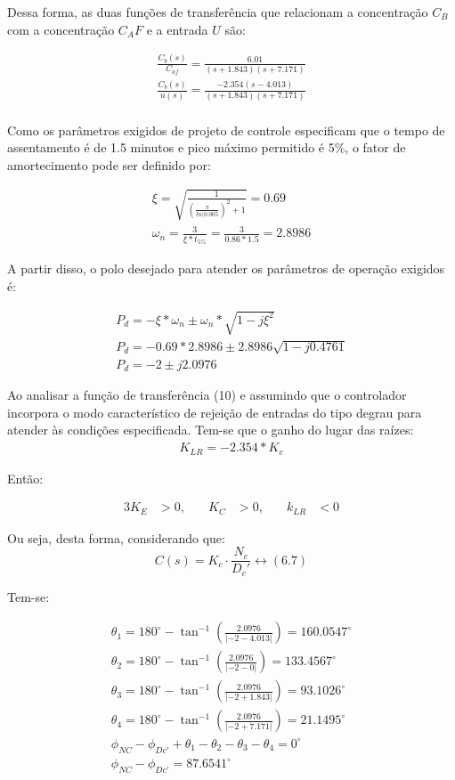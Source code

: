 \documentclass[a4paper,12pt]{article}
\begin{document}
Dessa forma, as duas funções de transferência que relacionam a concentração \(C_B\) com a concentração \(C_AF\) e a entrada \(U\) são:

\begin{align}
\frac{ C_b(s)}{C_{af}} = \frac{6.01}{(s + 1.843)(s + 7.171)}\\
\frac{ C_b(s)}{u(s)} = \frac{-2.354(s-4.013)}{(s + 1.843)(s + 7.171)}
\\
\end{align}


Como os parâmetros exigidos de projeto de controle especificam que o tempo de assentamento é de 1.5 minutos e pico máximo permitido é 5\%, o fator de amortecimento pode ser definido por:

\begin{align}
\xi = \sqrt{\frac{1}{(\frac{\pi}{ln(0.005})^2+1}} = 0.69\\
\omega_n = \frac{3}{\xi*t_{5\%}} = \frac{3}{0.86*1.5} = 2.8986
\end{align}

A partir disso, o polo desejado  para atender os parâmetros de operação exigidos é: 

\begin{align}
P_d = - \xi*\omega_n \pm \omega_n*\sqrt{1-j\xi^2}\\
P_d = - 0.69*2.8986 \pm 2.8986 \sqrt{1-j0.4761}\\
P_d = -2 \pm j2.0976
\end{align}

Ao analisar a função de transferência (10) e assumindo que o controlador incorpora o modo característico de rejeição de entradas do tipo degrau para atender às condições especificada. Tem-se que o ganho do lugar das raízes:
\begin{align}
K_{LR} = -2.354*K_c    
\end{align}

Então:

\begin{alignat}{3}
K_E &> 0, & \quad K_C &> 0, & \quad k_{LR} &< 0
\end{alignat}

Ou seja, desta forma, considerando que:
\[ C(s) = K_c \cdot \frac{N_c}{D_c'} \leftrightarrow (6.7) \]

Tem-se:

\begin{align}
\theta_1 = 180^\circ - \tan^{-1} \left( \frac{2.0976}{|-2 - 4.013|} \right) = 160.0547^\circ\\
\theta_2 = 180^\circ - \tan^{-1} \left( \frac{2.0976}{|-2 - 0|} \right) = 133.4567^\circ\\
\theta_3 = 180^\circ - \tan^{-1} \left( \frac{2.0976}{|-2 + 1.843|} \right) = 93.1026^\circ\\
\theta_4 = 180^\circ - \tan^{-1} \left( \frac{2.0976}{|-2 + 7.171|} \right) = 21.1495^\circ\\ 
\phi_{NC} - \phi_{Dc'} + \theta_1 - \theta_2 - \theta_3 - \theta_4 = 0^\circ\\
\phi_{NC} - \phi_{Dc'} = 87.6541^\circ
\end{align}
\end{document}
